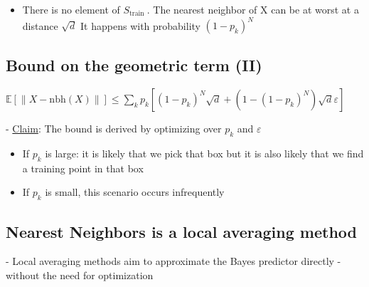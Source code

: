 


\begin{itemize}
  \item There is no element of $S_{\text {train }}$. The nearest neighbor of $\mathrm{X}$ can be at worst at a distance $\sqrt{d}$ It happens with probability $\left(1-p_{k}\right)^{N}$
\end{itemize}



\subsection*{Bound on the geometric term (II)}
$\mathbb{E}[\|X-\mathrm{nbh}(X)\|] \leq \sum_{k} p_{k}\left[\left(1-p_{k}\right)^{N} \sqrt{d}+\left(1-\left(1-p_{k}\right)^{N}\right) \sqrt{d} \varepsilon\right]$

- \underline{Claim}: The bound is derived by optimizing over $p_{k}$ and $\varepsilon$

\begin{itemize}
  \item If $p_{k}$ is large: it is likely that we pick that box but it is also likely that we find a training point in that box
  \item If $p_{k}$ is small, this scenario occurs infrequently
\end{itemize}


\subsection*{Nearest Neighbors is a local averaging method}
- Local averaging methods aim to approximate the Bayes predictor directly - without the need for optimization


  
